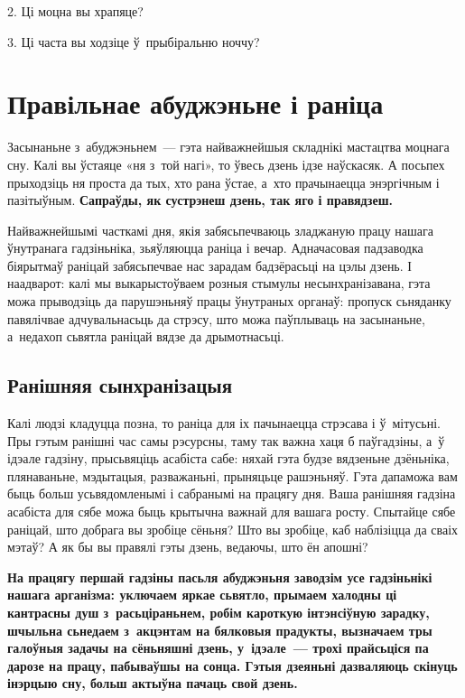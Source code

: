 2. Ці моцна вы храпяце?

3. Ці часта вы ходзіце ў~прыбіральню ноччу?


\section{Правільнае абуджэньне і раніца}

Засынаньне з~абуджэньнем~--- гэта найважнейшыя складнікі мастацтва моцнага сну. Калі вы ўстаяце «ня з~той нагі», то ўвесь дзень ідзе наўскасяк. А посьпех прыходзіць ня проста да тых, хто рана ўстае, а~хто прачынаецца энэргічным і пазітыўным. \textbf{Сапраўды, як сустрэнеш дзень, так яго і правядзеш.}

Найважнейшымі часткамі дня, якія забясьпечваюць зладжаную працу нашага ўнутранага гадзіньніка, зьяўляюцца раніца і вечар. Адначасовая падзаводка біярытмаў раніцай забясьпечвае нас зарадам бадзёрасьці на цэлы дзень. І наадварот: калі мы выкарыстоўваем розныя стымулы несынхранізавана, гэта можа прыводзіць да парушэньняў працы ўнутраных органаў: пропуск сьняданку павялічвае адчувальнасьць да стрэсу, што можа паўплываць на засынаньне, а~недахоп сьвятла раніцай вядзе да дрымотнасьці.

\subsection*{Ранішняя сынхранізацыя}

Калі людзі кладуцца позна, то раніца для іх пачынаецца стрэсава і ў~мітусьні. Пры гэтым ранішні час самы рэсурсны, таму так важна хаця б паўгадзіны, а~ў ідэале гадзіну, прысьвяціць асабіста сабе: няхай гэта будзе вядзеньне дзёньніка, плянаваньне, мэдытацыя, разважаньні, прыняцьце рашэньняў. Гэта дапаможа вам быць больш усьвядомленымі і сабранымі на працягу дня. Ваша ранішняя гадзіна асабіста для сябе можа быць крытычна важнай для вашага росту. Спытайце сябе раніцай, што добрага вы зробіце сёньня? Што вы зробіце, каб наблізіцца да сваіх мэтаў? А як бы вы правялі гэты дзень, ведаючы, што ён апошні?

\textbf{На працягу першай гадзіны пасьля абуджэньня заводзім усе гадзіньнікі нашага арганізма: уключаем яркае сьвятло, прымаем халодны ці кантрасны душ з~расьціраньнем, робім кароткую інтэнсіўную зарадку, шчыльна сьнедаем з~акцэнтам на бялковыя прадукты, вызначаем тры галоўныя задачы на сёньняшні дзень, у~ідэале~--- трохі прайсьціся па дарозе на працу, пабываўшы на сонца. Гэтыя дзеяньні дазваляюць скінуць інэрцыю сну, больш актыўна пачаць свой дзень.}

